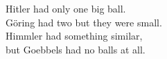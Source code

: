 
            Hitler had only one big ball. \\
            Göring had two but they were small. \\
            Himmler had something similar, \\
            but Goebbels had no balls at all. \\
